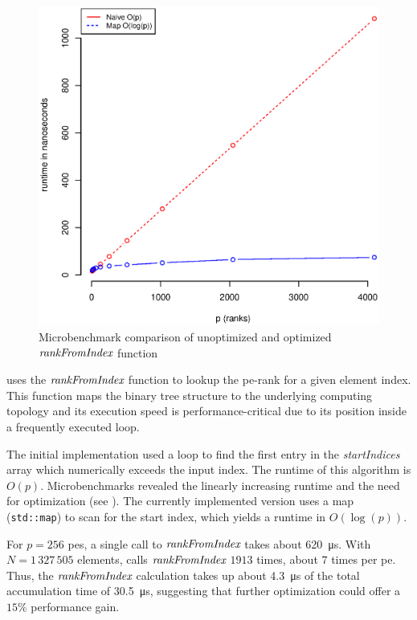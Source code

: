 \begin{figure}
\centering
\includegraphics[scale=0.55]{figures/microbenchmark_rank_from_index.eps}
\caption{Microbenchmark comparison of unoptimized and optimized $\textit{rankFromIndex}$ function}
\label{fig:microbenchmarkRankFromIndex}

\end{figure}

 uses the $\textit{rankFromIndex}$ function to lookup the \gls{pe}-rank for a given element index.
This function maps the binary tree structure to the underlying computing topology and its execution speed is performance-critical due to its position inside a frequently executed loop.

The initial implementation used a loop to find the first entry in the \textit{startIndices} array which numerically exceeds the input index.
The runtime of this algorithm is $O(p)$.
Microbenchmarks revealed the linearly increasing runtime and the need for optimization (see ).
The currently implemented version uses a map (\texttt{std::map}) to scan for the start index, which yields a runtime in $O(\log(p))$.

For $p=256$ \glspl{pe}, a single call to $\textit{rankFromIndex}$ takes about \SI{620}{\micro\second}.
With $N = 1\,327\,505$ elements,  calls $\textit{rankFromIndex}$ $1913$ times, about $7$ times per \gls{pe}.
Thus, the $\textit{rankFromIndex}$ calculation takes up about \SI{4.3}{\micro\second} of the total accumulation time of \SI{30.5}{\micro\second}, suggesting that further optimization could offer a $15\%$ performance gain.
